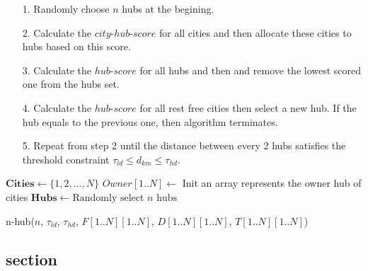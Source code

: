 \documentclass{llncs}
\begin{document}
\begin{itemize}
	\item [1.] Randomly choose $n$ hubs at the begining. 
	\item [2.] Calculate the $city\text{-}hub\text{-}score$ for all cities and then allocate these cities to hubs based on this score.
	\item [3.]  Calculate the $hub\text{-}score$ for all hubs and then and remove the lowest scored one from the hubs set.
	\item [4.] Calculate the $hub\text{-}score$ for all rest free cities then select a new hub. If the hub equals to the previous one, then algorithm terminates.
	\item[5.] Repeat from step 2 until the distance between every 2 hubs satisfies the threshold constraint $\tau_{ld} \leq d_{km} \leq \tau_{hd}$.
\end{itemize}
\begin{minipage}[t]{\textwidth}
	\begin{algorithm}[H]
		\BlankLine
		$\mathbf{Cities} \leftarrow \{1,2,...,N\}$\;
		$Owner[1..N] \leftarrow$ Init an array represents the owner hub of cities\;
		$\mathbf{Hubs} \leftarrow \text{Randomly select $n$ hubs}$\;
		\caption{n-hub($n$, $\tau_{ld}$, $\tau_{hd}$, $F[1..N][1..N]$, $D[1..N][1..N]$, $T[1..N][1..N]$)}\label{Alg.n-hub}
	\end{algorithm}
\end{minipage}

\subsection{section}
\end{document}
